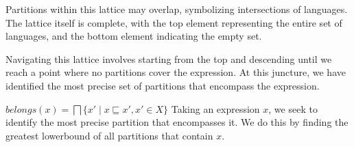 Partitions within this lattice may overlap, symbolizing intersections of languages. The lattice itself is complete, with the top element representing the entire set of languages, and the bottom element indicating the empty set.

Navigating this lattice involves starting from the top and descending until we reach a point where no partitions cover the expression. At this juncture, we have identified the most precise set of partitions that encompass the expression.

$ belongs(x)=\bigsqcap\{x' \mid x \sqsubseteq x', x' \in X\} $
Taking an expression $x$, we seek to identify the most precise partition that encompasses it. We do this by finding the greatest lowerbound of all partitions that contain $x$.
